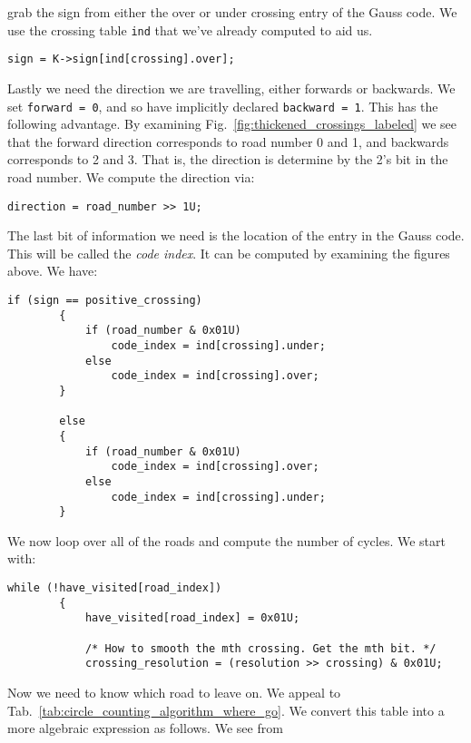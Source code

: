         grab the sign from either the over or under crossing entry of the Gauss
        code. We use the crossing table \texttt{ind} that we've already computed
        to aid us.
\begin{lstlisting}[style=CStyle, firstnumber = 44]
        sign = K->sign[ind[crossing].over];
\end{lstlisting}
        Lastly we need the direction we are travelling, either forwards or
        backwards. We set \texttt{forward = 0}, and so have implicitly
        declared \texttt{backward = 1}. This has the following advantage. By
        examining Fig.~\ref{fig:thickened_crossings_labeled} we see that the
        forward direction corresponds to road number 0 and 1, and backwards
        corresponds to 2 and 3. That is, the direction is determine by the
        2's bit in the road number. We compute the direction via:
\begin{lstlisting}[style=CStyle, firstnumber = 46]
        direction = road_number >> 1U;
\end{lstlisting}
        The last bit of information we need is the location of the entry in the
        Gauss code. This will be called the \textit{code index}. It can be
        computed by examining the figures above. We have:
\begin{lstlisting}[style=CStyle, firstnumber = 48]
        if (sign == positive_crossing)
        {
            if (road_number & 0x01U)
                code_index = ind[crossing].under;
            else
                code_index = ind[crossing].over;
        }

        else
        {
            if (road_number & 0x01U)
                code_index = ind[crossing].over;
            else
                code_index = ind[crossing].under;
        }
\end{lstlisting}
        We now loop over all of the roads and compute the number of cycles. We
        start with:
        \newpage
\begin{lstlisting}[style=CStyle, firstnumber = 64]
        while (!have_visited[road_index])
        {
            have_visited[road_index] = 0x01U;

            /* How to smooth the mth crossing. Get the mth bit. */
            crossing_resolution = (resolution >> crossing) & 0x01U;
\end{lstlisting}
        Now we need to know which road to leave on. We appeal to
        Tab.~\ref{tab:circle_counting_algorithm_where_go}. We convert this table
        into a more algebraic expression as follows. We see from
